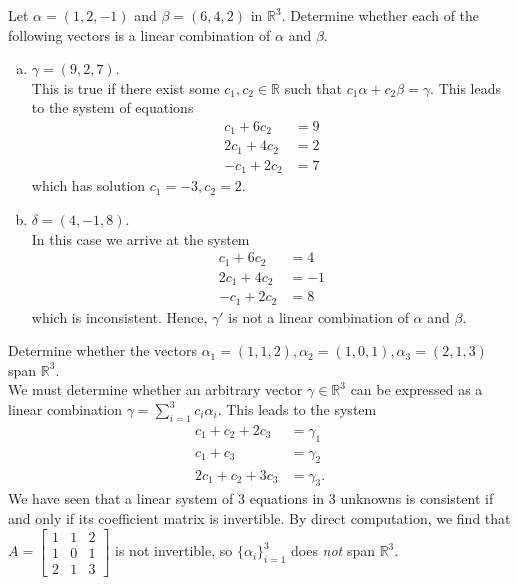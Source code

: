 \documentclass[12pt,letterpaper,reqno]{article}
\numberwithin{equation}{section}
\begin{document}
\begin{example}
Let $\alpha=(1,2,-1)$ and $\beta=(6,4,2)$ in $\mathbb{R}^3$. Determine whether each of the following vectors is a linear combination of $\alpha$ and $\beta$.
\begin{enumerate}[(a)]
	\item $\gamma=(9,2,7)$. \\
	{\color{red} This is true if there exist some $c_1,c_2 \in \mathbb{R}$ such that $c_1\alpha+c_2\beta=\gamma$. This leads to the system of equations \begin{align*}
		c_1+6c_2&=9 \\
		2c_1+4c_2&=2 \\
		-c_1+2c_2&=7
	\end{align*} which has solution $c_1=-3, c_2=2$.} \\
	\item $\delta=(4,-1,8)$. \\
	{\color{red} In this case we arrive at the system \begin{align*}
		c_1+6c_2&=4 \\ 2c_1+4c_2 &= -1 \\
		-c_1 + 2c_2 &=8
	\end{align*} which is inconsistent. Hence, $\gamma'$ is not a linear combination of $\alpha$ and $\beta$.}
\end{enumerate}	
\end{example}

\begin{example}
Determine whether the vectors $\alpha_1=(1,1,2), \alpha_2=(1,0,1), \alpha_3=(2,1,3)$ span $\mathbb{R}^3$. \\
{\color{red} We must determine whether an arbitrary vector $\gamma \in \mathbb{R}^3$ can be expressed as a linear combination $\gamma=\sum_{i=1}^3c_i\alpha_i$. This leads to the system \begin{align*}
	c_1+c_2+2c_3 &=\gamma_1 \\
	c_1+c_3 &=\gamma_2 \\
	2c_1+c_2+3c_3 &= \gamma_3.
\end{align*} We have seen that a linear system of 3 equations in 3 unknowns is consistent if and only if its coefficient matrix is invertible. By direct computation, we find that $A=\begin{bmatrix}
	1 & 1 & 2 \\ 1 & 0 & 1 \\ 2 & 1 & 3
\end{bmatrix}$ is not invertible, so $\{\alpha_i\}_{i=1}^3$ does \emph{not} span $\mathbb{R}^3$.}	
\end{example}
\end{document}
